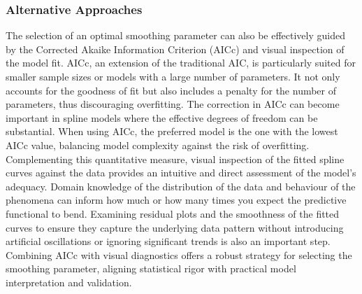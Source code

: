 \documentclass[12pt, twoside,hidelinks]{article}
\theoremstyle{definition}
\numberwithin{equation}{section}
\begin{document}
\subsubsection{Alternative Approaches}\label{sec:smooth:lambda:alt}

The selection of an optimal smoothing parameter can also be effectively guided by the Corrected Akaike Information Criterion (AICc) and visual inspection of the model fit. AICc, an extension of the traditional AIC, is particularly suited for smaller sample sizes or models with a large number of parameters. It not only accounts for the goodness of fit but also includes a penalty for the number of parameters, thus discouraging overfitting. The correction in AICc can become important in spline models where the effective degrees of freedom can be substantial. When using AICc, the preferred model is the one with the lowest AICc value, balancing model complexity against the risk of overfitting. Complementing this quantitative measure, visual inspection of the fitted spline curves against the data provides an intuitive and direct assessment of the model’s adequacy. Domain knowledge of the distribution of the data and behaviour of the phenomena can inform how much or how many times you expect the predictive functional to bend. Examining residual plots and the smoothness of the fitted curves to ensure they capture the underlying data pattern without introducing artificial oscillations or ignoring significant trends is also an important step. Combining AICc with visual diagnostics offers a robust strategy for selecting the smoothing parameter, aligning statistical rigor with practical model interpretation and validation. 
\newline
\end{document}
